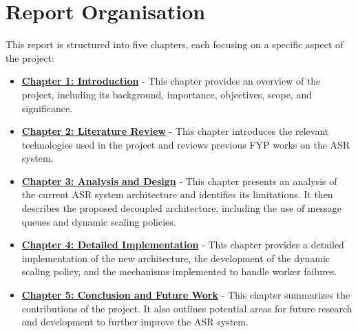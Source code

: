 \section{Report Organisation}
This report is structured into five chapters, each focusing on a specific aspect of the project:

\begin{itemize}
    \item \hyperref[chapter:introduction]{\textbf{Chapter 1: Introduction}} - This chapter provides an overview of the project, including its background, importance, objectives, scope, and significance.
    
    \item \hyperref[chapter:literature_review]{\textbf{Chapter 2: Literature Review}} - This chapter introduces the relevant technologies used in the project and reviews previous FYP works on the ASR system.
    
    \item \hyperref[chapter:analysis_and_design]{\textbf{Chapter 3: Analysis and Design}} - This chapter presents an analysis of the current ASR system architecture and identifies its limitations. It then describes the proposed decoupled architecture, including the use of message queues and dynamic scaling policies.
    
    \item \hyperref[chapter:detailed_implementation]{\textbf{Chapter 4: Detailed Implementation}} - This chapter provides a detailed implementation of the new architecture, the development of the dynamic scaling policy, and the mechanisms implemented to handle worker failures.
    
    \item \hyperref[chapter:conclusion_and_future_work]{\textbf{Chapter 5: Conclusion and Future Work}} - This chapter summarizes the contributions of the project. It also outlines potential areas for future research and development to further improve the ASR system.
\end{itemize}


